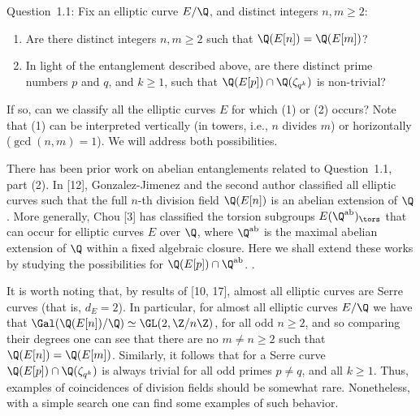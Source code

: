 Question~1.1: Fix an elliptic curve $E/\Q$, and distinct integers $n, m \geq 2$:
	\begin{enumerate}[(1)]
	\item Are there distinct integers $n, m \geq 2$ such that $\Q(E[n])= \Q(E[m])$?
	\item In light of the entanglement described above, are there distinct prime numbers $p$ and $q$, and $k \geq 1$, such that $\Q(E[p]) \cap \Q(\zeta_{q^k})$ is non-trivial?
	\end{enumerate}
If so, can we classify all the elliptic curves $E$ for which (1) or (2) occurs? Note that (1) can be interpreted vertically (in towers, i.e., $n$ divides $m$) or horizontally ($\gcd(n,m)= 1$). We will address both possibilities.


There has been prior work on abelian entanglements related to Question~1.1, part (2). In [12], Gonzalez-Jimenez and the second author classified all elliptic curves such that the full $n$-th division field $\Q(E[n])$ is an abelian extension of $\Q$. More generally, Chou [3] has classified the torsion subgroups $E(\Q^{\text{ab}})_\tors$ that can occur for elliptic curves $E$ over $\Q$, where $\Q^{\text{ab}}$ is the maximal abelian extension of $\Q$ within a fixed algebraic closure. Here we shall extend these works by studying the
possibilities for $\Q(E[p]) \cap \Q^{\text{ab}}$. 
.


It is worth noting that, by results of [10, 17], almost all elliptic curves are Serre curves (that is, $d_E= 2$). In particular, for almost all elliptic curves $E/\Q$ we have that $\Gal(\Q(E[n])/\Q) \simeq \GL(2, \Z/n\Z)$, for all odd $n \geq 2$, and so comparing their degrees one can see that there are no $m \neq n \geq 2$ such that $\Q(E[n])= \Q(E[m])$. Similarly, it follows that for a Serre curve $\Q(E[p]) \cap \Q(\zeta_{q^k})$ is always trivial for all odd primes $p \neq q$, and all $k \geq 1$. Thus, examples of coincidences of division fields should be somewhat rare. Nonetheless, with a simple search one can find some examples of such behavior.




